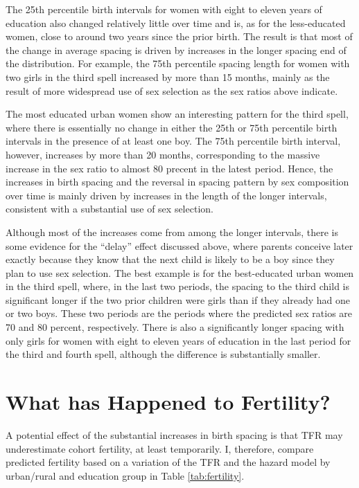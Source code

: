 \documentclass[12pt,letterpaper]{article}
\begin{document}
The 25th percentile birth intervals for women with eight to eleven years of education also 
changed relatively little over time and is, as for the less-educated women, close to
around two years since the prior birth.
The result is that most of the change in average spacing is driven by increases in the
longer spacing end of the distribution.
For example, the 75th percentile spacing length for women with two girls in the third 
spell increased by more than 15 months, mainly as the result of more widespread use of sex 
selection as the sex ratios above indicate.
 
The most educated urban women show an interesting pattern for the third spell, where there 
is essentially no change in either the 25th or 75th percentile birth intervals in the
presence of at least one boy.
The 75th percentile birth interval, however, increases by more than 20 months,
corresponding to the massive increase in the sex ratio to almost 80 precent in the 
latest period.
Hence, the increases in birth spacing and the reversal in spacing pattern by sex
composition over time is mainly driven by increases in the length of the longer intervals, 
consistent with a substantial use of sex selection.

Although most of the increases come from among the longer intervals, there is some 
evidence for the ``delay'' effect discussed above, where parents conceive later
exactly because they know that the next child is likely to be a boy since they plan
to use sex selection.
The best example is for the best-educated urban women in the third spell, where, in the 
last two periods, the spacing to the third child is significant longer if the two prior 
children were girls than if they already had one or two boys.
These two periods are the periods where the predicted sex ratios are 70 and 80 percent,
respectively.
There is also a significantly longer spacing with only girls for women with eight to
eleven years of education in the last period for the third and fourth spell, although
the difference is substantially smaller.


\section{What has Happened to Fertility?\label{sec:fertility}}

A potential effect of the substantial increases in birth spacing is that TFR may 
underestimate cohort fertility, at least temporarily.
I, therefore, compare predicted fertility based on a variation of the TFR and the 
hazard model by urban/rural and education group in Table \ref{tab:fertility}.
\end{document}

